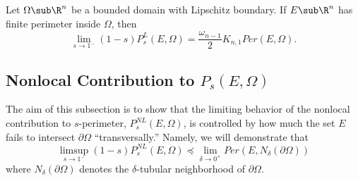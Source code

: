\documentclass[../main.tex]{subfiles}
\begin{document}
\begin{proposition}
    Let $ \Omega\sub \R^{n} $ be a bounded domain with Lipschitz boundary. If $ E\sub \R^{n} $ has finite perimeter inside $ \Omega $, then
    \[
        \lim_{s\to1^{-}}(1-s)P_{s}^{L}(E,\Omega) = \frac{\omega_{n-1}}{2}K_{n,1}Per(E,\Omega).
    \]
\end{proposition}



\subsection{Nonlocal Contribution to $ P_{s}(E,\Omega) $}

The aim of this subsection is to show that the limiting behavior of the nonlocal contribution to $ s $-perimeter, $ P_{s}^{NL}(E,\Omega) $, is controlled by how much the set $ E $ fails to intersect $ \partial \Omega $ ``transversally.'' Namely, we will demonstrate that
\[
    \limsup_{s\to1^{-}}(1-s)P_{s}^{NL}(E,\Omega) \preceq \lim_{\delta\to0^{+}}Per(E,N_{\delta}(\partial \Omega))
\]
where $ N_{\delta}(\partial \Omega) $ denotes the $ \delta $-tubular neighborhood of $ \partial \Omega $.
\end{document}
